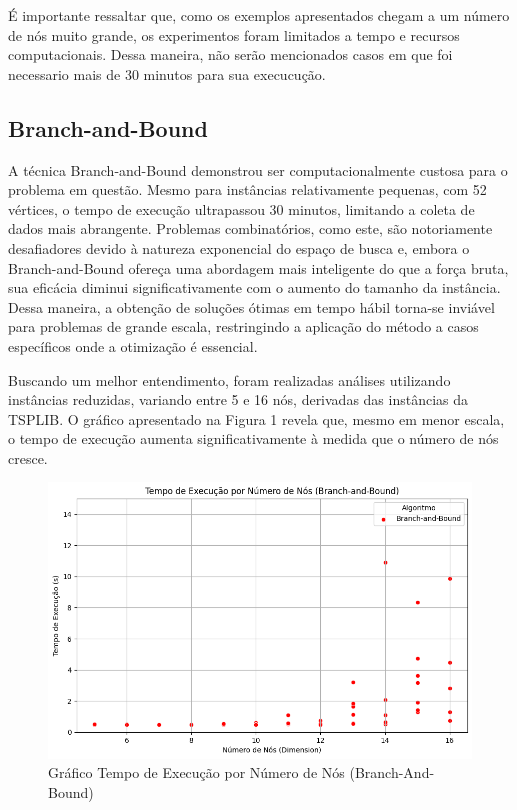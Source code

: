 \documentclass[12pt]{article}
\begin{document}
É importante ressaltar que, como os exemplos apresentados chegam a um número de nós muito grande, os experimentos foram limitados a tempo e recursos computacionais. Dessa maneira, não serão mencionados casos em que foi necessario mais de 30 minutos para sua execucução.

\subsection{Branch-and-Bound}
A técnica Branch-and-Bound demonstrou ser computacionalmente custosa para o problema em questão. Mesmo para instâncias relativamente pequenas, com 52 vértices, o tempo de execução ultrapassou 30 minutos, limitando a coleta de dados mais abrangente.
Problemas combinatórios, como este, são notoriamente desafiadores devido à natureza exponencial do espaço de busca e, embora o Branch-and-Bound ofereça uma abordagem mais inteligente do que a força bruta, sua eficácia diminui significativamente com o aumento do tamanho da instância. Dessa maneira, a obtenção de soluções ótimas em tempo hábil torna-se inviável para problemas de grande escala, restringindo a aplicação do método a casos específicos onde a otimização é essencial.

Buscando um melhor entendimento, foram realizadas análises utilizando instâncias reduzidas, variando entre 5 e 16 nós, derivadas das instâncias da TSPLIB. O gráfico apresentado na Figura 1 revela que, mesmo em menor escala, o tempo de execução aumenta significativamente à medida que o número de nós cresce.

\begin{figure}[ht]
\centering
\includegraphics[width=.7\textwidth]{Figure6.png}
\caption{Gráfico Tempo de Execução por Número de Nós (Branch-And-Bound)}
\label{fig:exampleFig1}
\end{figure}
\end{document}
